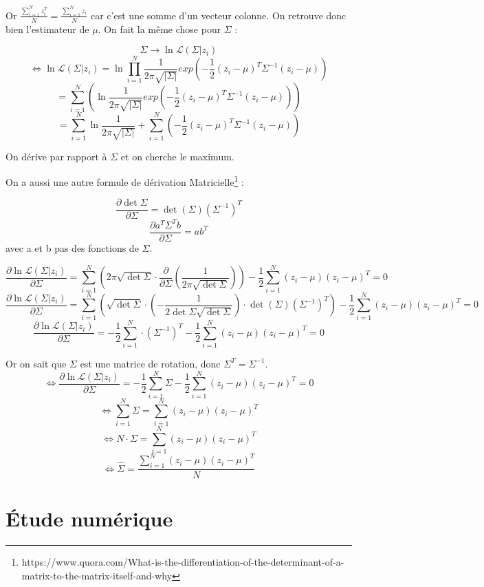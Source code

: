 \documentclass{article}
\begin{document}
Or $\frac{\sum_{i=1}^{N}z_i^{T}}{N} = \frac{\sum_{i=1}^{N}z_i}{N}$ car c'est une somme d'un vecteur colonne.
On retrouve donc bien l'estimateur de $\mu$.
On fait la même chose pour $\Sigma$ :

$$\Sigma \rightarrow \ln \mathcal{L}(\Sigma | z_i)$$
$$\Leftrightarrow \ln \mathcal{L}(\Sigma | z_i)=\ln \prod_{i=1}^{N} \frac{1}{2\pi\sqrt{|\Sigma|}}exp(-\frac{1}{2}(z_i-\mu)^{T}\Sigma^{-1}(z_i-\mu))$$
$$= \sum_{i=1}^{N} (\ln \frac{1}{2\pi\sqrt{|\Sigma|}}exp(-\frac{1}{2}(z_i-\mu)^{T}\Sigma^{-1}(z_i-\mu)))$$
$$= \sum_{i=1}^{N}\ln \frac{1}{2\pi\sqrt{|\Sigma|}} + \sum_{i=1}^{N}(-\frac{1}{2}(z_i-\mu)^{T}\Sigma^{-1}(z_i-\mu))$$

On dérive par rapport à $\Sigma$ et on cherche le maximum.

On a aussi une autre formule de dérivation Matricielle\footnote{https://www.quora.com/What-is-the-differentiation-of-the-determinant-of-a-matrix-to-the-matrix-itself-and-why} :

$$\frac{\partial \det\Sigma}{\partial \Sigma} = \det(\Sigma)(\Sigma^{-1})^{T}$$
$$\frac{\partial a^{T}\Sigma^{T}b}{\partial \Sigma} = ab^{T}$$
avec a et b pas des fonctions de $\Sigma$.

$$\frac{\partial \ln \mathcal{L}(\Sigma | z_i)}{\partial \Sigma}=\sum_{i=1}^{N}(2\pi\sqrt{\det\Sigma}\cdot\frac{\partial }{\partial \Sigma}(\frac{1}{2\pi\sqrt{\det \Sigma}}))-\frac{1}{2}\sum_{i=1}^{N}(z_i-\mu)(z_i-\mu)^{T}=0$$
$$\frac{\partial \ln \mathcal{L}(\Sigma | z_i)}{\partial \Sigma}=\sum_{i=1}^{N}(\sqrt{\det\Sigma}\cdot(-\frac{1}{2\det\Sigma \sqrt{\det \Sigma}})\cdot\det(\Sigma)(\Sigma^{-1})^{T})-\frac{1}{2}\sum_{i=1}^{N}(z_i-\mu)(z_i-\mu)^{T}=0$$
$$\frac{\partial \ln \mathcal{L}(\Sigma | z_i)}{\partial \Sigma}=-\frac{1}{2}\sum_{i=1}^{N}\cdot(\Sigma^{-1})^{T}-\frac{1}{2}\sum_{i=1}^{N}(z_i-\mu)(z_i-\mu)^{T}=0$$

Or on sait que $\Sigma$ est une matrice de rotation, donc $\Sigma^{T}=\Sigma^{-1}$.
$$\Leftrightarrow \frac{\partial \ln \mathcal{L}(\Sigma | z_i)}{\partial \Sigma}=-\frac{1}{2}\sum_{i=1}^{N}\Sigma-\frac{1}{2}\sum_{i=1}^{N}(z_i-\mu)(z_i-\mu)^{T}=0$$
$$\Leftrightarrow \sum_{i=1}^{N}\Sigma=\sum_{i=1}^{N}(z_i-\mu)(z_i-\mu)^{T}$$
$$\Leftrightarrow N\cdot\Sigma=\sum_{i=1}^{N}(z_i-\mu)(z_i-\mu)^{T}$$
$$\Leftrightarrow \hat{\Sigma}=\frac{\sum_{i=1}^{N}(z_i-\mu)(z_i-\mu)^{T}}{N}$$

\section{Étude numérique}
\end{document}
